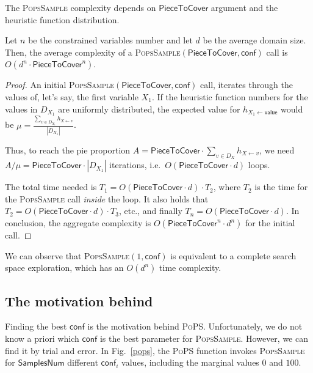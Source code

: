 \documentclass{ws-ijait}
\begin{document}
The \textsc{PopsSample} complexity depends on
$\mathsf{PieceToCover}$ argument and the heuristic function
distribution.
\begin{lemma}
  Let $n$ be the constrained variables number and let $d$ be
  the average domain size. Then, the average complexity of a
  \textsc{PopsSample}$(\mathsf{PieceToCover},\mathsf{conf})$
  call is $O(d^n \cdot \mathsf{PieceToCover}^n)$.
\end{lemma}
\begin{proof}
  An initial
  \textsc{PopsSample}$(\mathsf{PieceToCover},\mathsf{conf})$
  call, iterates through the values of, let's say, the first
  variable $X_1$. If the heuristic function numbers for the
  values in $D_{X_1}$ are uniformly distributed, the
  expected value for $h_{X_1 \gets \mathsf{value}}$ would be
  $\mu = \frac{\sum_{v \in D_{X_1}} h_{X \gets
  v}}{|D_{X_1}|}$.

  Thus, to reach the pie proportion $A =
  \mathsf{PieceToCover} \cdot \sum_{v \in D_X} h_{X \gets
  v}$, we need $A / \mu = \mathsf{PieceToCover} \cdot
  |D_{X_1}|$ iterations, i.e.\ 
  $O(\mathsf{PieceToCover} \cdot d)$ loops.

  The total time needed is $T_1 = O(\mathsf{PieceToCover}
  \cdot d) \cdot T_2$, where $T_2$ is the time for the
  \textsc{PopsSample} call \emph{inside} the loop. It also
  holds that $T_2 = O(\mathsf{PieceToCover} \cdot d) \cdot
  T_3$, etc., and finally $T_n = O(\mathsf{PieceToCover}
  \cdot d)$. In conclusion, the aggregate complexity is
  $O(\mathsf{PieceToCover}^n \cdot d^n)$ for the initial
  call.
\end{proof}
We can observe that \textsc{PopsSample}$(1,\mathsf{conf})$
is equivalent to a complete search space exploration, which
has an $O(d^n)$ time complexity.

\subsection{The motivation behind \PoPS\label{sampling}}

Finding the best $\mathsf{conf}$ is the motivation behind
\textsc{PoPS}. Unfortunately, we do not know a priori which
$\mathsf{conf}$ is the best parameter for
\textsc{PopsSample}. However, we can find it by trial and
error. In Fig.~\ref{pops}, the \textsc{PoPS} function
invokes \textsc{PopsSample} for $\mathsf{SamplesNum}$
different $\mathsf{conf}_i$ values, including the marginal
values $0$ and $100$.
\end{document}
